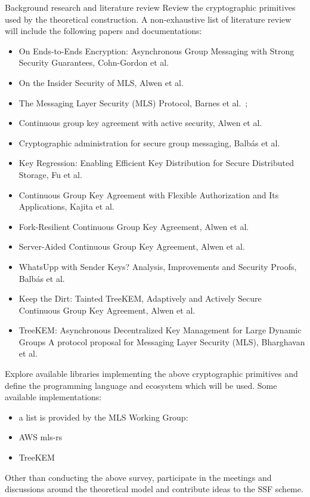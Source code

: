 \documentclass[E]{BAMASA}
\begin{document}
\tasks
\begin{workpackage}{Background research and literature review}\label{wp:background}
Review the cryptographic primitives used by the theoretical construction. A non-exhaustive list of literature review will include the following papers and documentations:
\begin{itemize}
    \item On Ends-to-Ends Encryption: Asynchronous Group Messaging with Strong Security Guarantees, Cohn-Gordon et al.~\cite{CCS:CCGMM18}
    \item On the Insider Security of MLS, Alwen et al.~\cite{CCS:AHKM22}
    \item The Messaging Layer Security (MLS) Protocol, Barnes et al.~\cite{rfc9420};
    \item Continuous group key agreement with active security, Alwen et al.~\cite{TCC:ACJM20}
    \item  Cryptographic administration for secure
group messaging, Balb\'as et al.~\cite{USENIX:BalColVau23}
    \item Key Regression: Enabling Efficient Key Distribution for Secure Distributed Storage, Fu et al.~\cite{NDSS:FuKamKoh06}
    \item Continuous Group Key Agreement with Flexible Authorization and Its Applications, Kajita et al.~\cite{IWSPA:KEONO23}
    \item Fork-Resilient Continuous Group Key Agreement, Alwen et al.~\cite{C:AlwMulTse23}
    \item Server-Aided Continuous Group Key Agreement, Alwen et al.~\cite{CCS:AHKM22}
    \item WhatsUpp with Sender Keys? Analysis, Improvements and Security Proofs, Balb\'as et al.~\cite{AC:BalColGaj23}
    \item Keep the Dirt: Tainted TreeKEM, Adaptively and Actively Secure Continuous Group Key Agreement, Alwen et al.~\cite{SP:KPWKCCMYAP21}
    \item TreeKEM: Asynchronous Decentralized Key Management for Large Dynamic Groups A protocol proposal for Messaging Layer Security (MLS), Bharghavan et al.~\cite{TreeKEM}
\end{itemize} 

Explore available libraries implementing the above cryptographic primitives and define 
the programming language and ecosystem which will be used. 
Some available implementations:
\begin{itemize}
    \item a list is provided by the MLS Working Group:~\cite{MLSWGimpl}
    \item AWS mls-rs~\cite{AWSMLSrs}
    \item TreeKEM~\cite{TreeKEMimpl}
\end{itemize}

Other than conducting the above survey, participate in the meetings and discussions around the theoretical model and contribute ideas to the SSF scheme.

\end{workpackage}
\end{document}
